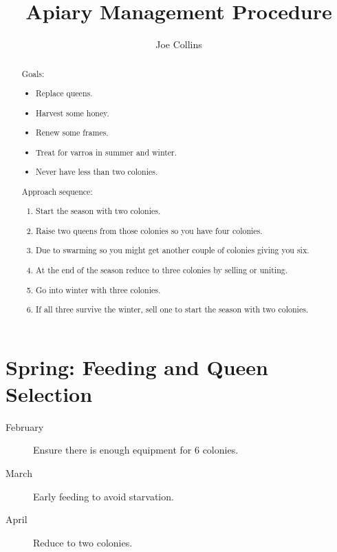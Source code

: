 \documentclass{./BeekeepingBook}
\title{Apiary Management Procedure}
\author{Joe Collins}
\begin{document}
\maketitle

\begin{abstract}

  Goals:

  \begin{itemize}
    \item Replace queens.
    \item Harvest some honey. 
    \item Renew some frames.
    \item Treat for varroa in summer and winter.
    \item Never have less than two colonies.
  \end{itemize}

  Approach sequence:

  \begin{enumerate}
    \item Start the season with two colonies.
    \item Raise two queens from those colonies so you have four colonies.
    \item Due to swarming so you might get another couple of colonies giving you six.
    \item At the end of the season reduce to three colonies by selling or uniting.
    \item Go into winter with three colonies.
    \item If all three survive the winter, sell one to start the season with two colonies. 
  \end{enumerate}

\end{abstract}

\clearpage
\tableofcontents

\clearpage
\section{Spring: Feeding and Queen Selection}
\begin{description}
  \item[February] Ensure there is enough equipment for 6 colonies.
  \item[March] Early feeding to avoid starvation.
  \item[April] Reduce to two colonies.
\end{description}



\end{document}
